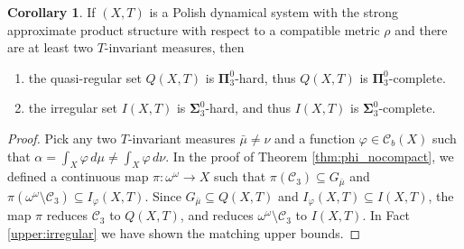 \documentclass{amsart}
\theoremstyle{definition}
\newtheorem{cor}[thm]{Corollary}
\newcommand{\bP}{\boldsymbol{\Pi}}
\newcommand{\bS}{\boldsymbol{\Sigma}}
\renewcommand{\phi}{\varphi}
\begin{document}
\begin{cor}
If $(X,T)$ is  a Polish dynamical system with the strong approximate product structure
with respect to a compatible metric $\rho$ and there are at least two $T$-invariant measures, then
\begin{enumerate}
\item the quasi-regular set $Q(X,T)$ is $\bP_3^0$-hard, thus
$Q(X,T)$ is $\bP^0_3$-complete.
\item the irregular set $I(X,T)$ is $\bS_3^0$-hard, and thus
$I(X,T)$ is $\bS_3^0$-complete.
\end{enumerate}
\end{cor}

\begin{proof}
Pick any two $T$-invariant measures $\bar{\mu} \neq \nu$ and a function $\phi \in \mathcal{C}_b(X)$ such that $\alpha = \int_X \phi \, d \mu \neq \int_X \phi \, d \nu$. In the proof of Theorem \ref{thm:phi_nocompact}, we defined a continuous map $\pi \colon  \omega ^ \omega \to X$ such that $\pi(\mathcal{C}_3) \subseteq G_{\bar{\mu}}$ and $\pi( \omega ^ \omega \setminus \mathcal{C}_3) \subseteq I_\phi(X,T)$. Since $G_{\bar{\mu}} \subseteq Q(X,T)$ and $ I_\phi(X,T) \subseteq I(X,T)$, the map $\pi$ reduces $\mathcal{C}_3$ to $Q(X,T)$, and reduces $ \omega ^ \omega \setminus \mathcal{C}_3$ to $I(X,T)$. In Fact \ref{upper:irregular} we have shown the matching upper bounds.
\end{proof}
\end{document}
